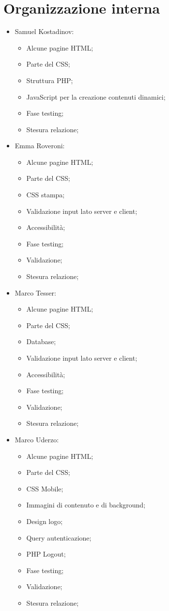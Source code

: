 \section{Organizzazione interna}

\begin{itemize}
	\item Samuel Kostadinov:
	\begin{itemize}
		\item Alcune pagine HTML;
		\item Parte del CSS;
		\item Struttura PHP;
		\item JavaScript per la creazione contenuti dinamici;
		\item Fase testing; 
		\item Stesura relazione;
	\end{itemize}
	\item Emma Roveroni:
	\begin{itemize}
		\item Alcune pagine HTML;
		\item Parte del CSS;
		\item CSS stampa;
		\item Validazione input lato server e client; 
		\item Accessibilità;
		\item Fase testing;
		\item Validazione;
		\item Stesura relazione;
	\end{itemize}
	\item Marco Tesser:
	\begin{itemize}
		\item Alcune pagine HTML;
		\item Parte del CSS;
		\item Database;
		\item Validazione input lato server e client;
		\item Accessibilità;
		\item Fase testing;
		\item Validazione;
		\item Stesura relazione;
	\end{itemize}
	\item Marco Uderzo:
	\begin{itemize}
		\item Alcune pagine HTML;
		\item Parte del CSS;
		\item CSS Mobile;
		\item Immagini di contenuto e di background;
		\item Design logo;
		\item Query autenticazione;
		\item PHP Logout;
		\item Fase testing;
		\item Validazione;
		\item Stesura relazione;
	\end{itemize}
\end{itemize} 